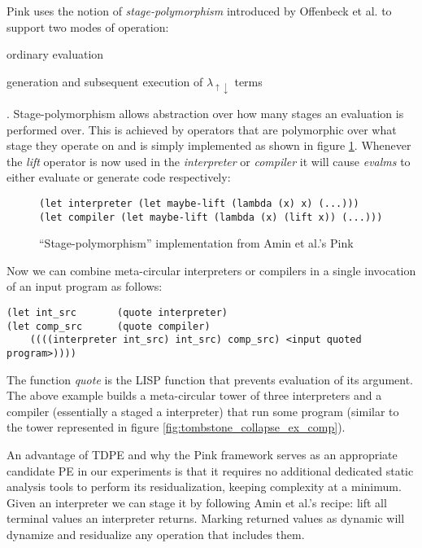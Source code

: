 \documentclass[a4paper,12pt,twoside,openright]{report}
\theoremstyle{definition}
\newcommand{\mslang}{$\lambda_{\uparrow\downarrow}$}
\begin{document}
Pink uses the notion of \textit{stage-polymorphism} introduced by Offenbeck et al. \cite{ofenbeck2017staging} to support two modes of operation:
\begin{enumerate*}[label=(\arabic*)]
	\item ordinary evaluation
	\item generation and subsequent execution of \mslang{} terms
\end{enumerate*}.
Stage-polymorphism allows abstraction over how many stages an evaluation is performed over. This is achieved by operators that are polymorphic over what stage they operate on and is simply implemented as shown in figure \ref{lst:stage_poly_impl}. Whenever the \textit{lift} operator is now used in the \textit{interpreter} or \textit{compiler} it will cause \textit{evalms} to either evaluate or generate code respectively:

\begin{figure}[ht]
\centering
\begin{verbatim}
(let interpreter (let maybe-lift (lambda (x) x) (...)))
(let compiler (let maybe-lift (lambda (x) (lift x)) (...)))
\end{verbatim}
\caption{``Stage-polymorphism'' implementation from Amin et al.'s Pink \cite{amin2017collapsing}}
\label{lst:stage_poly_impl}
\end{figure}

Now we can combine meta-circular interpreters or compilers in a single invocation of an input program as follows:
\begin{verbatim}
(let int_src       (quote interpreter)
(let comp_src      (quote compiler)
    ((((interpreter int_src) int_src) comp_src) <input quoted program>))))
\end{verbatim}
The function \textit{quote} is the LISP function that prevents evaluation of its argument. The above example builds a meta-circular tower of three interpreters and a compiler (essentially a staged a interpreter) that run some program (similar to the tower represented in figure \ref{fig:tombstone_collapse_ex_comp}).

An advantage of TDPE and why the Pink framework serves as an appropriate candidate PE in our experiments is that it requires no additional dedicated static analysis tools to perform its residualization, keeping complexity at a minimum. Given an interpreter we can stage it by following Amin et al.'s \cite{amin2017collapsing} recipe: lift all terminal values an interpreter returns. Marking returned values as dynamic will dynamize and residualize any operation that includes them.
\end{document}
